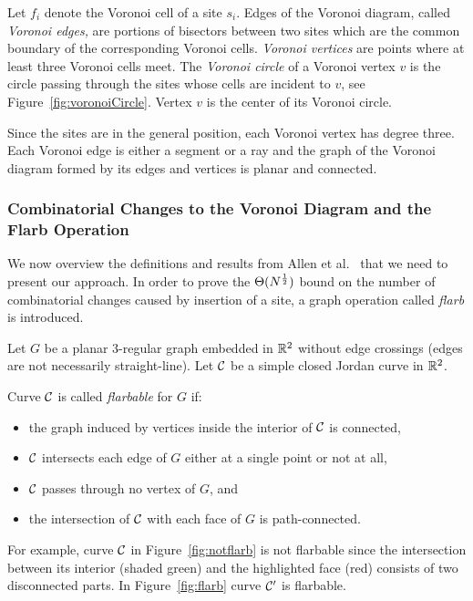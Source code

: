 \documentclass[a4paper,11pt]{article}
\begin{document}
Let  $f_i$ denote the Voronoi cell of a site $s_i$. Edges of the Voronoi diagram, called \emph{Voronoi edges,} are portions of bisectors between two sites which are the common boundary of the corresponding Voronoi cells. \emph{Voronoi vertices} are points where at least three Voronoi cells meet. The \emph{Voronoi circle} of a Voronoi vertex $v$ is the circle passing through the sites whose cells are incident to $v$, see Figure~\ref{fig:voronoiCircle}. Vertex $v$ is the center of its Voronoi circle.

Since the sites are in the general position, each Voronoi vertex has degree three. Each Voronoi edge is either a segment or a ray and the graph of the Voronoi diagram formed by its edges and vertices is planar and connected.

\subsubsection{Combinatorial Changes to the Voronoi Diagram and the Flarb Operation}
\label{sec:defflarb}

We now overview the definitions and results from Allen et al.~\cite{DBLP:journals/dcg/AllenBIL17} that we need to present our approach. In order to prove the $\Theta(N^\frac{1}{2})$ bound on the number of combinatorial changes caused by insertion of a site, a graph operation called \emph{flarb} is introduced.

Let $G$ be a planar 3-regular graph embedded in $\mathbb R^2$ without edge crossings (edges are not necessarily straight-line). Let $\mathcal C$ be a simple closed Jordan curve in $\mathbb R^2$. 

\begin{definition} 
Curve $\mathcal C$ is called \emph{flarbable} for $G$ if: \end{definition}

\begin{itemize}
	\item the graph induced by vertices inside the interior of $\mathcal C$ is connected,
	\item $\mathcal C$ intersects each edge of $G$ either at a single point or not at all,
	\item $\mathcal C$ passes through no vertex of $G$, and
	\item the intersection of $\mathcal C$ with each face of $G$ is path-connected.
\end{itemize}

For example, curve $\mathcal C$ in Figure~\ref{fig:notflarb} is not flarbable since the intersection between its interior (shaded green) and the highlighted face (red) consists of two disconnected parts. In Figure~\ref{fig:flarb} curve $\mathcal C'$ is flarbable.
\end{document}
